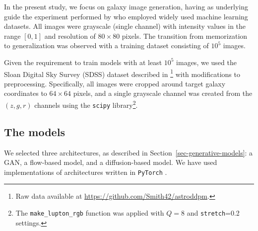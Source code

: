 \documentclass[fleqn,usenatbib]{mnras}
\begin{document}
{\color{red}
In the present study, we focus on galaxy image generation, having as underlying guide the experiment performed by \cite{kadkhodaie2024generalization} who  employed widely used machine learning datasets. All images were grayscale (single channel) with intensity values in the range $[0,1]$ and resolution of $80 \times 80$ pixels. The transition from memorization to generalization was observed with a training dataset consisting of $10^5$ images.


Given the requirement to train models with at least $10^5$ images, we used the Sloan Digital Sky Survey (SDSS) dataset described in \citep{smith2021}\footnote{Raw data available at \url{https://github.com/Smith42/astroddpm}.} with modifications to preprocessing. Specifically, all images were cropped around target galaxy coordinates to $64 \times 64$ pixels, and a single grayscale channel was created from the $(z, g, r)$ channels using the \texttt{scipy} \citep{2020SciPy-NMeth} library\footnote{The \texttt{make\_lupton\_rgb} function was applied with $Q=8$ and \texttt{stretch}=0.2 settings.}. 
}
%
\subsection{The models}
\label{sec-Exp-Models}
%
We selected three architectures, as described in Section~\ref{sec-generative-models}: a GAN, a flow-based model, and a diffusion-based model. We have used implementations of architectures written in \texttt{PyTorch} \citep{PyTorch2019}. 
\end{document}
